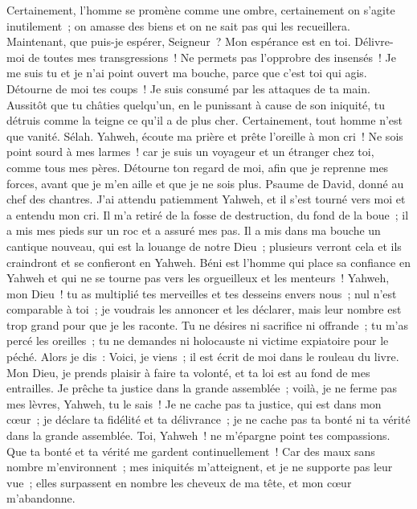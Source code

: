 \begin{multicols}{2}
Certainement, l'homme se promène comme une ombre, certainement on s'agite inutilement~; on amasse des biens et on ne sait pas qui les recueillera.
Maintenant, que puis-je espérer, Seigneur~? Mon espérance est en toi.
Délivre-moi de toutes mes transgressions~! Ne permets pas l'opprobre des insensés~!
Je me suis tu et je n'ai point ouvert ma bouche, parce que c'est toi qui agis.
Détourne de moi tes coups~! Je suis consumé par les attaques de ta main.
Aussitôt que tu châties quelqu'un, en le punissant à cause de son iniquité, tu détruis comme la teigne ce qu'il a de plus cher. Certainement, tout homme n'est que vanité. Sélah.
Yahweh, écoute ma prière et prête l'oreille à mon cri~! Ne sois point sourd à mes larmes~! car je suis un voyageur et un étranger chez toi, comme tous mes pères.
Détourne ton regard de moi, afin que je reprenne mes forces, avant que je m'en aille et que je ne sois plus.
\VerseOne{}Psaume de David, donné au chef des chantres.
J'ai attendu patiemment Yahweh, et il s'est tourné vers moi et a entendu mon cri.
Il m'a retiré de la fosse de destruction, du fond de la boue~; il a mis mes pieds sur un roc et a assuré mes pas.
Il a mis dans ma bouche un cantique nouveau, qui est la louange de notre Dieu~; plusieurs verront cela et ils craindront et se confieront en Yahweh.
Béni est l'homme qui place sa confiance en Yahweh et qui ne se tourne pas vers les orgueilleux et les menteurs~!
Yahweh, mon Dieu~! tu as multiplié tes merveilles et tes desseins envers nous~; nul n'est comparable à toi~; je voudrais les annoncer et les déclarer, mais leur nombre est trop grand pour que je les raconte.
Tu ne désires ni sacrifice ni offrande~; tu m'as percé les oreilles~; tu ne demandes ni holocauste ni victime expiatoire pour le péché.
Alors je dis~: Voici, je viens~; il est écrit de moi dans le rouleau du livre.
Mon Dieu, je prends plaisir à faire ta volonté, et ta loi est au fond de mes entrailles.
Je prêche ta justice dans la grande assemblée~; voilà, je ne ferme pas mes lèvres, Yahweh, tu le sais~!
Je ne cache pas ta justice, qui est dans mon cœur~; je déclare ta fidélité et ta délivrance~; je ne cache pas ta bonté ni ta vérité dans la grande assemblée.
Toi, Yahweh~! ne m'épargne point tes compassions. Que ta bonté et ta vérité me gardent continuellement~!
Car des maux sans nombre m'environnent~; mes iniquités m'atteignent, et je ne supporte pas leur vue~; elles surpassent en nombre les cheveux de ma tête, et mon cœur m'abandonne.

\end{multicols}
